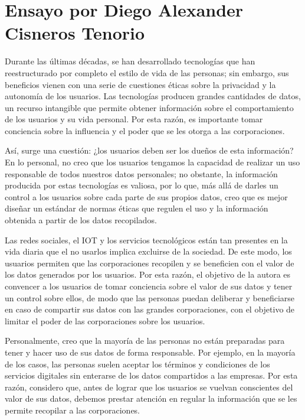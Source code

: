 \section*{Ensayo por Diego Alexander Cisneros Tenorio}

Durante las últimas décadas, se han desarrollado tecnologías que han reestructurado por completo el estilo de vida de las personas; sin embargo, sus beneficios vienen con una serie de cuestiones éticas sobre la privacidad y la autonomía de los usuarios. Las tecnologías producen grandes cantidades de datos, un recurso intangible que permite obtener información sobre el comportamiento de los usuarios y su vida personal. Por esta razón, es importante tomar conciencia sobre la influencia y el poder que se les otorga a las corporaciones.

Así, surge una cuestión: ¿los usuarios deben ser los dueños de esta información? En lo personal, no creo que los usuarios tengamos la capacidad de realizar un uso responsable de todos nuestros datos personales; no obstante, la información producida por estas tecnologías es valiosa, por lo que, más allá de darles un control a los usuarios sobre cada parte de sus propios datos, creo que es mejor diseñar un estándar de normas éticas que regulen el uso y la información obtenida a partir de los datos recopilados.

Las redes sociales, el IOT y los servicios tecnológicos están tan presentes en la vida diaria que el no usarlos implica excluirse de la sociedad. De este modo, los usuarios permiten que las corporaciones recopilen y se beneficien con el valor de los datos generados por los usuarios. Por esta razón, el objetivo de la autora es convencer a los usuarios de tomar conciencia sobre el valor de sus datos y tener un control sobre ellos, de modo que las personas puedan deliberar y beneficiarse en caso de compartir sus datos con las grandes corporaciones, con el objetivo de limitar el poder de las corporaciones sobre los usuarios.

Personalmente, creo que la mayoría de las personas no están preparadas para tener y hacer uso de sus datos de forma responsable. Por ejemplo, en la mayoría de los casos, las personas suelen aceptar los términos y condiciones de los servicios digitales sin enterarse de los datos compartidos a las empresas. Por esta razón, considero que, antes de lograr que los usuarios se vuelvan conscientes del valor de sus datos, debemos prestar atención en regular la información que se les permite recopilar a las corporaciones.

